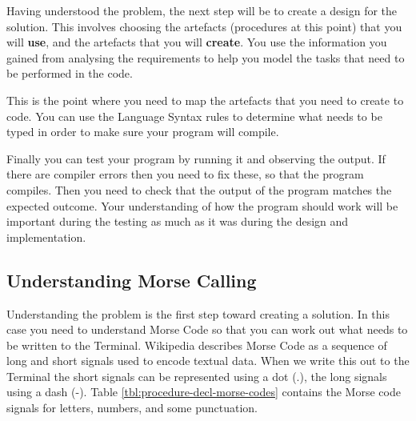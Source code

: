 Having understood the problem, the next step will be to create a design for the solution. This involves choosing the artefacts (procedures at this point) that you will \textbf{use}, and the artefacts that you will \textbf{create}. You use the information you gained from analysing the requirements to help you model the tasks that need to be performed in the code.

This is the point where you need to map the artefacts that you need to create to code. You can use the Language Syntax rules to determine what needs to be typed in order to make sure your program will compile.

Finally you can test your program by running it and observing the output. If there are compiler errors then you need to fix these, so that the program compiles. Then you need to check that the output of the program matches the expected outcome. Your understanding of how the program should work will be important during the testing as much as it was during the design and implementation.

\clearpage
\subsection{Understanding Morse Calling} %
\label{ssub:understanding_morse_calling}

Understanding the problem is the first step toward creating a solution. In this case you need to understand Morse Code so that you can work out what needs to be written to the Terminal. Wikipedia describes Morse Code as a sequence of long and short signals used to encode textual data. When we write this out to the Terminal the short signals can be represented using a dot (.), the long signals using a dash (-). Table \ref{tbl:procedure-decl-morse-codes} contains the Morse code signals for letters, numbers, and some punctuation.

